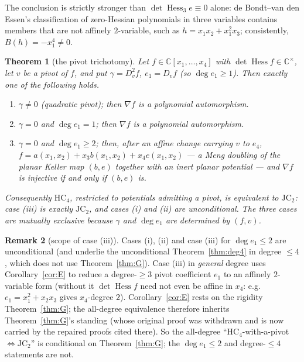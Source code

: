 \documentclass[11pt]{article}
\theoremstyle{plain}
\newtheorem{theorem}{Theorem}[section]
\theoremstyle{definition}
\newtheorem{remark}[theorem]{Remark}
\newcommand{\C}{\mathbb{C}}
\newcommand{\Hess}{\operatorname{Hess}}
\newcommand{\HC}{\mathrm{HC}}
\newcommand{\JC}{\mathrm{JC}}
\begin{document}
The conclusion is strictly stronger than $\det\Hess_3e\equiv0$ alone: de
Bondt--van den Essen's classification of zero-Hessian polynomials in three
variables contains members that are not affinely $2$-variable, such as
$h=x_1x_2+x_1^2x_3$; consistently, $B(h)=-x_1^4\ne0$.

\begin{theorem}[the pivot trichotomy]\label{thm:main}
Let $f\in\C[x_1,\dots,x_4]$ with $\det\Hess f\in\C^\times$, let $v$ be a
pivot of $f$, and put $\gamma=D_v^2f$, $e_1=D_vf$ (so $\deg e_1\ge1$).
Then exactly one of the following holds.
\begin{enumerate}
\item[\rm(i)] $\gamma\ne0$ (quadratic pivot); then $\nabla f$ is a
polynomial automorphism.
\item[\rm(ii)] $\gamma=0$ and $\deg e_1=1$; then $\nabla f$ is a
polynomial automorphism.
\item[\rm(iii)] $\gamma=0$ and $\deg e_1\ge2$; then, after an affine
change carrying $v$ to $e_4$,
$f=a(x_1,x_2)+x_3b(x_1,x_2)+x_4e(x_1,x_2)$ --- a Meng doubling of the
planar Keller map $(b,e)$ together with an inert planar potential --- and
$\nabla f$ is injective if and only if $(b,e)$ is.
\end{enumerate}
\emph{Consequently $\HC_4$, restricted to potentials admitting a pivot, is
equivalent to $\JC_2$}: case \rm{(iii)} is exactly $\JC_2$, and cases
\rm{(i)} and \rm{(ii)} are unconditional. The three cases are mutually
exclusive because $\gamma$ and $\deg e_1$ are determined by $(f,v)$.
\end{theorem}

\begin{remark}[scope of case (iii)]
Cases (i), (ii) and case (iii) for $\deg e_1\le2$ are unconditional (and
underlie the unconditional Theorem~\ref{thm:deg4} in degree $\le4$, which does
not use Theorem~\ref{thm:G}). Case (iii) in \emph{general} degree uses
Corollary~\ref{cor:E} to reduce a degree-$\ge3$ pivot coefficient $e_1$ to an
affinely $2$-variable form (without it $\det\Hess f$ need not even be affine in
$x_4$: e.g.\ $e_1=x_1^2+x_2x_3$ gives $x_4$-degree $2$). Corollary~\ref{cor:E}
rests on the rigidity Theorem~\ref{thm:G}; the all-degree equivalence therefore
inherits Theorem~\ref{thm:G}'s standing (whose original proof was withdrawn and
is now carried by the repaired proofs cited there). So the all-degree
``$\HC_4$-with-a-pivot $\Leftrightarrow\JC_2$'' is conditional on
Theorem~\ref{thm:G}; the $\deg e_1\le2$ and degree-$\le4$ statements are not.
\end{remark}
\end{document}
